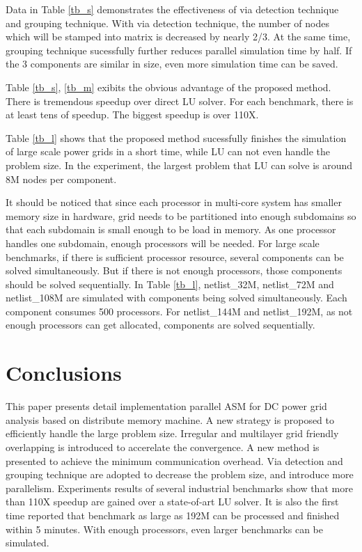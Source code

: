 \documentclass{sig-alternate}
\begin{document}
	Data in Table \ref{tb_s} demonstrates the effectiveness of via detection technique and grouping technique. With via detection 
	technique, the 
	number of nodes which will be stamped into matrix is decreased by nearly 2/3. At the same time, grouping technique sucessfully
	further reduces parallel simulation time by half. If the 3 components are similar in size, even more simulation time can be
	saved.

	Table \ref{tb_s}, \ref{tb_m} exibits the obvious advantage of the proposed method. There is tremendous 
	speedup over direct LU solver. For each benchmark, there is at least tens of speedup. The biggest speedup is over 110X. 

	Table \ref{tb_l} shows that the proposed method sucessfully finishes the simulation of large scale power grids
	in a short time, while LU can not even handle the problem size. In the experiment, the largest problem that LU can solve is 
	around 8M nodes per component. 

	It should be noticed that since each processor in multi-core system has smaller memory size in hardware, grid needs to be 
	partitioned into enough subdomains so that each subdomain is small enough to be load in memory. As one processor handles one 
	subdomain, enough processors will be needed. For large scale benchmarks, if there is sufficient processor resource, several 
	components can be solved simultaneously. But if there is not enough processors, those components should be 
	solved sequentially. In Table \ref{tb_l}, netlist\_32M, netlist\_72M and netlist\_108M are 
	simulated with components being solved simultaneously. Each component consumes 500 processors. For netlist\_144M and 
	netlist\_192M, as not enough processors can get allocated, components are solved sequentially.

\section{Conclusions}
	This paper presents detail implementation parallel ASM for DC power grid analysis based on distribute memory machine. 
	A new strategy is proposed to efficiently handle the large problem size. Irregular and multilayer grid friendly overlapping 
	is introduced to accerelate the convergence. A new method is presented to achieve the minimum communication overhead. Via 
	detection and grouping technique are adopted to decrease the problem size, and introduce more parallelism. Experiments 
	results of several industrial benchmarks show that more than 110X speedup are gained over a state-of-art LU solver. It is also 
	the first time reported that benchmark as large as 192M can be processed and finished within 5 minutes. With enough processors, 
	even larger benchmarks can be simulated.




\end{document}
